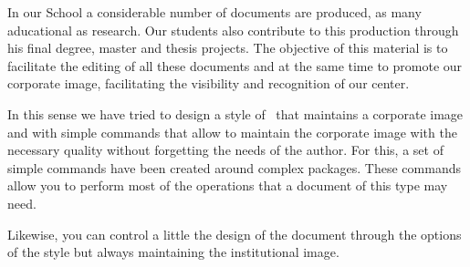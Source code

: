 
In our School a considerable number of documents are produced, as many aducational as research. Our students also contribute to this production
through his final degree, master and thesis projects. The objective of this material is to facilitate the editing of all these documents and at the same time to promote our corporate image, facilitating the visibility and recognition of our center.

In this sense we have tried to design a style of \LaTeXe\ that maintains a corporate image and with simple commands that allow to maintain the corporate image with the necessary quality without forgetting the needs of the author. For this, a set of simple commands have been created around complex packages. These commands allow you to perform most of the operations that a document of this type may need.

Likewise, you can control a little the design of the document through the options of the style but always maintaining the institutional image.

